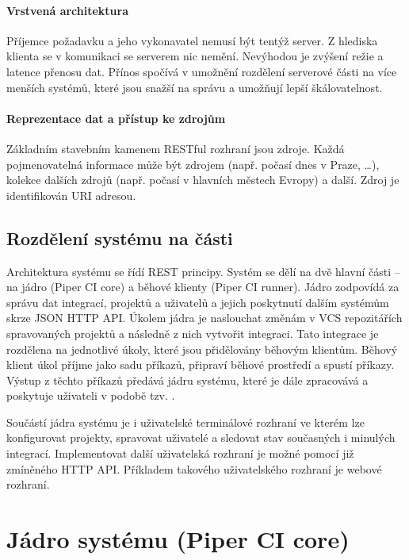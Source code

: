 \paragraph{Vrstvená architektura}

Příjemce požadavku a jeho vykonavatel nemusí být tentýž server.
Z hlediska klienta se v komunikaci se serverem nic nemění.
Nevýhodou je zvýšení režie a latence přenosu dat.
Přínos spočívá v umožnění rozdělení serverové části na více menších systémů, které jsou snažší na správu a umožňují lepší škálovatelnost.

\paragraph{Reprezentace dat a přístup ke zdrojům}

Základním stavebním kamenem RESTful rozhraní jsou zdroje.
Každá pojmenovatelná informace může být zdrojem (např. počasí dnes v Praze, \ldots), kolekce dalších zdrojů (např. počasí v hlavních městech Evropy) a další.
Zdroj je identifikován URI adresou.
\cite{rest_zdroje}

\subsection{Rozdělení systému na části}

Architektura systému se řídí REST principy.
Systém se dělí na dvě hlavní části -- na jádro (Piper CI core) a běhové klienty (Piper CI runner).
Jádro zodpovídá za správu dat integrací, projektů a uživatelů a jejich poskytnutí dalším systémům skrze JSON HTTP API.
Úkolem jádra je naslouchat změnám v VCS repozitářích spravovaných projektů a následně z nich vytvořit integraci.
Tato integrace je rozdělena na jednotlivé úkoly, které jsou přidělovány běhovým klientům.
Běhový klient úkol příjme jako sadu příkazů, připraví běhové prostředí a spustí příkazy.
Výstup z těchto příkazů předává jádru systému, které je dále zpracovává a poskytuje uživateli v podobě tzv. .


Součástí jádra systému je i uživatelské terminálové rozhraní ve kterém lze konfigurovat projekty, spravovat uživatelé a sledovat stav současných i minulých integrací.
Implementovat další uživatelská rozhraní je možné pomocí již zmíněného HTTP API.
Příkladem takového uživatelského rozhraní je webové rozhraní.

\section{Jádro systému (Piper CI core)}

